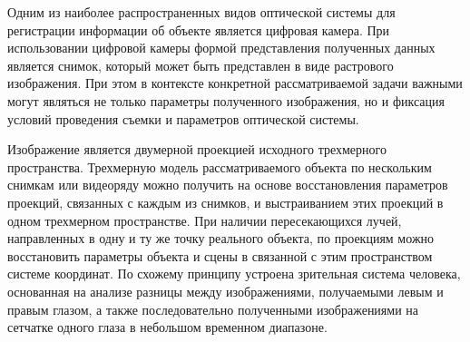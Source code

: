 \begin{SCn}
\end{SCn}

Одним из наиболее распространенных видов оптической системы для регистрации информации об объекте является цифровая камера. При использовании цифровой камеры формой представления полученных данных является снимок, который может быть представлен в виде растрового изображения. При этом в контексте конкретной рассматриваемой задачи важными могут являться не только параметры полученного изображения, но и фиксация условий проведения съемки и параметров оптической системы.  

Изображение является двумерной проекцией исходного трехмерного пространства. Трехмерную модель рассматриваемого объекта по нескольким снимкам или видеоряду можно получить на основе восстановления параметров проекций, связанных с каждым из снимков, и выстраиванием этих проекций в одном трехмерном пространстве. При наличии пересекающихся лучей, направленных в одну и ту же точку реального объекта, по проекциям можно восстановить параметры объекта и сцены в связанной с этим пространством системе координат. По схожему принципу устроена зрительная система человека, основанная на анализе разницы между изображениями, получаемыми левым и правым глазом, а также последовательно полученными изображениями на сетчатке одного глаза в небольшом временном диапазоне.

\begin{SCn}
\end{SCn}

\begin{SCn}
\end{SCn}

\begin{SCn}
\end{SCn}

